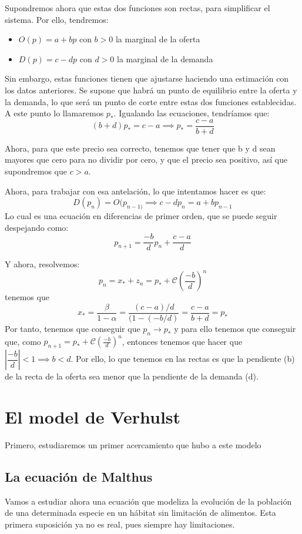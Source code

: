 \documentclass[11pt, a4paper, titlepage]{article}
\theoremstyle{theorem-style}
\theoremstyle{definition-style}
\theoremstyle{remark-style}
\theoremstyle{example-style}
\begin{document}
Supondremos ahora que estas dos funciones son rectas, para simplificar el sistema. Por ello, tendremos:
\begin{itemize}
\item $O(p) = a+bp $ con $b>0$ la marginal de la oferta
\item $D(p) = c -dp $ con $d> 0$ la marginal de la demanda
	
\end{itemize}
Sin embargo, estas funciones tienen que ajustarse haciendo una estimación con los datos anteriores. Se supone que habrá un punto de equilibrio entre la oferta y la demanda, lo que será un punto de corte entre estas dos funciones establecidas. A este punto lo llamaremos $p_*$. Igualando las ecuaciones, tendríamos que:
\[
 (b+d)p_*= c-a \implies p_* = \frac{c-a}{b+d}
\]

Ahora, para que este precio sea correcto, tenemos que tener que b y d sean mayores que cero para no dividir por cero, y que el precio sea positivo, así que supondremos que $c> a$.

Ahora, para trabajar con esa antelación, lo que intentamos hacer es que:
\[
D(p_n) = O(p_{n-1)} \implies c-dp_n = a+bp_{n-1}
\]
Lo cual es una ecuación en diferencias de primer orden, que se puede seguir despejando como:
\[
p_{n+1} = \dfrac{-b}{d}p_n+ \dfrac{c-a}{d}
\]

Y ahora, resolvemos:
\[
p_n = x_* + z_n = p_* + \mathcal{C}(\frac{-b}{d})^n
\] tenemos que 
\[
x_* = \frac{\beta}{1-\alpha} = \frac{(c-a)/d}{(1-(-b/d)}= \frac{c-a}{b+d} = p_*
\]
Por tanto, tenemos que conseguir que $p_n \to p_*$ y para ello tenemos que conseguir que, como $p_{n+1} =p_* + \mathcal{C}(\frac{-b}{d})^n$, entonces tenemos que hacer que $|\dfrac{-b}{d}| < 1 \implies b < d$.
Por ello, lo que tenemos en las rectas es que la pendiente (b) de la recta de la oferta sea menor que la pendiente de la demanda (d).

\section{El model de Verhulst}

Primero, estudiaremos un primer acercamiento que hubo a este modelo

\subsection{La ecuación de Malthus}
Vamos a estudiar ahora una ecuación que modeliza la evolución de la población de una determinada especie en un hábitat sin limitación de alimentos. Esta primera suposición ya no es real, pues siempre hay limitaciones.
\end{document}
